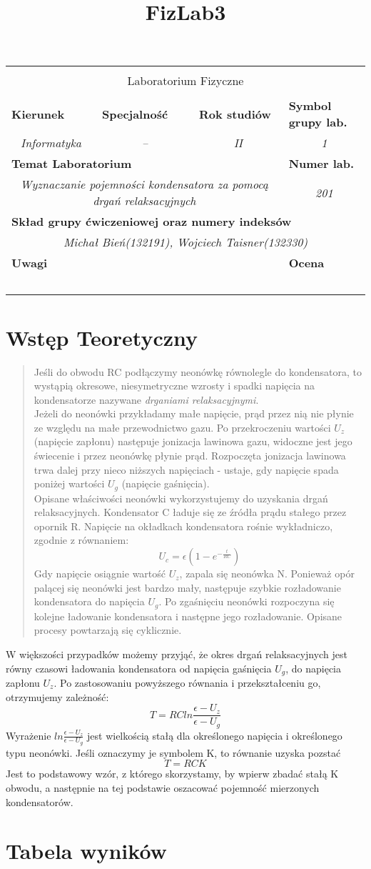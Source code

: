 \documentclass[polish,a4paper]{article}
\title{FizLab3}
\newcommand{\PRzFieldDsc}[1]{\sffamily\bfseries\scriptsize #1}
\newcommand{\PRzFieldCnt}[1]{\textit{#1}}
\newcommand{\PRzHeading}[8]{
\begin{center}
\begin{tabular}{ p{0.32\textwidth} p{0.15\textwidth} p{0.15\textwidth} p{0.12\textwidth} p{0.12\textwidth} }

  &   &   &   &   \\
\hline
\multicolumn{5}{|c|}{}\\[-1ex]
\multicolumn{5}{|c|}{{\LARGE #1}}\\
\multicolumn{5}{|c|}{}\\[-1ex]

\hline
\multicolumn{1}{|l|}{\PRzFieldDsc{Kierunek}}	& \multicolumn{1}{|l|}{\PRzFieldDsc{Specjalność}}	& \multicolumn{1}{|l|}{\PRzFieldDsc{Rok studiów}}	& \multicolumn{2}{|l|}{\PRzFieldDsc{Symbol grupy lab.}} \\
\multicolumn{1}{|c|}{\PRzFieldCnt{#2}}		& \multicolumn{1}{|c|}{\PRzFieldCnt{#3}}		& \multicolumn{1}{|c|}{\PRzFieldCnt{#4}}		& \multicolumn{2}{|c|}{\PRzFieldCnt{#5}} \\

\hline
\multicolumn{4}{|l|}{\PRzFieldDsc{Temat Laboratorium}}		& \multicolumn{1}{|l|}{\PRzFieldDsc{Numer lab.}} \\
\multicolumn{4}{|c|}{\PRzFieldCnt{#6}}				& \multicolumn{1}{|c|}{\PRzFieldCnt{#7}} \\

\hline
\multicolumn{5}{|l|}{\PRzFieldDsc{Skład grupy ćwiczeniowej oraz numery indeksów}}\\
\multicolumn{5}{|c|}{\PRzFieldCnt{#8}}\\

\hline
\multicolumn{3}{|l|}{\PRzFieldDsc{Uwagi}}	& \multicolumn{2}{|l|}{\PRzFieldDsc{Ocena}} \\
\multicolumn{3}{|c|}{\PRzFieldCnt{\ }}		& \multicolumn{2}{|c|}{\PRzFieldCnt{\ }} \\

\hline
\end{tabular}
\end{center}
}
\begin{document}
\PRzHeading{Laboratorium Fizyczne}{Informatyka}{--}{II}{1}{ Wyznaczanie pojemności kondensatora za pomocą drgań relaksacyjnych }{201}{Michał Bień(132191), Wojciech Taisner(132330)}{}

\section{Wstęp Teoretyczny}
\begin{quotation}\cite{szuba}
Jeśli do obwodu RC podłączymy neonówkę równolegle do kondensatora, to wystąpią okresowe, niesymetryczne wzrosty i spadki napięcia na kondensatorze nazywane \emph{drganiami relaksacyjnymi}. \\
Jeżeli do neonówki przykładamy małe napięcie, prąd przez nią nie płynie ze względu na małe przewodnictwo gazu. Po przekroczeniu wartości $U_z$ (napięcie zapłonu) następuje jonizacja lawinowa gazu, widoczne jest jego świecenie i przez neonówkę płynie prąd. Rozpoczęta jonizacja lawinowa trwa dalej przy nieco niższych napięciach - ustaje, gdy napięcie spada poniżej wartości $U_g$ (napięcie gaśnięcia). \\
Opisane właściwości neonówki wykorzystujemy do uzyskania drgań relaksacyjnych. Kondensator C ładuje się ze źródła prądu stałego przez opornik R. Napięcie na okładkach kondensatora rośnie wykładniczo, zgodnie z równaniem: $$ U_c = \epsilon (1-e^{-\frac{t}{RC}})$$ Gdy napięcie osiągnie wartość $U_z$, zapala się neonówka N. Ponieważ opór palącej się neonówki jest bardzo mały, następuje szybkie rozładowanie kondensatora do napięcia $U_g$. Po zgaśnięciu neonówki rozpoczyna się kolejne ładowanie kondensatora i następne jego rozładowanie. Opisane procesy powtarzają się cyklicznie.
\end{quotation}
W większości przypadków możemy przyjąć, że okres drgań relaksacyjnych jest równy czasowi ładowania kondensatora od napięcia gaśnięcia $U_g$, do napięcia zapłonu $U_z$.
Po zastosowaniu powyższego równania i przekształceniu go, otrzymujemy zależność: $$T=RC ln\frac{\epsilon-U_z}{\epsilon-U_g}$$ Wyrażenie $ln\frac{\epsilon-U_z}{\epsilon-U_g}$ jest wielkością stałą dla określonego napięcia i określonego typu neonówki. Jeśli oznaczymy je symbolem K, to równanie uzyska pozstać $$T=RCK$$ Jest to podstawowy wzór, z którego skorzystamy, by wpierw zbadać stałą K obwodu, a następnie na tej podstawie oszacować pojemność mierzonych kondensatorów.


\section{Tabela wyników}
\end{document}
